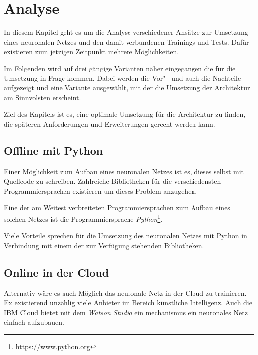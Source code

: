 \section{Analyse}
\label{sec:analyse}
In diesem Kapitel geht es um die Analyse verschiedener Ansätze zur Umsetzung eines neuronalen Netzes und den damit
verbundenen Trainings und Tests. Dafür existieren zum jetzigen Zeitpunkt mehrere Möglichkeiten.

Im Folgenden wird auf drei gängige Varianten näher eingegangen die für die Umsetzung in Frage kommen. Dabei werden die
Vor"~ und auch die Nachteile aufgezeigt und eine Variante ausgewählt, mit der die Umsetzung der Architektur am
Sinnvolsten erscheint.

Ziel des Kapitels ist es, eine optimale Umsetzung für die Architektur zu finden, die späteren Anforderungen und
Erweiterungen gerecht werden kann.

\subsection{Offline mit Python}
Einer Möglichkeit zum Aufbau eines neuronalen Netzes ist es, dieses selbst mit Quellcode zu schreiben. Zahlreiche
Bibliotheken für die verschiedensten Programmiersprachen existieren um dieses Problem anzugehen.

Eine der am Weitest verbreiteten Programmiersprachen zum Aufbau eines solchen Netzes ist die Programmiersprache
\textit{Python}\footnote{https://www.python.org}.

Viele Vorteile sprechen für die Umsetzung des neuronalen Netzes mit Python in Verbindung mit einem der zur Verfügung
stehenden Bibliotheken.


\subsection{Online in der Cloud}
Alternativ wäre es auch Möglich das neuronale Netz in der Cloud zu trainieren. Ex existierend unzählig viele Anbieter im
Bereich künstliche Intelligenz. Auch die IBM Cloud bietet mit dem \textit{Watson Studio} ein mechanismus ein neuronales
Netz einfach aufzubauen.


